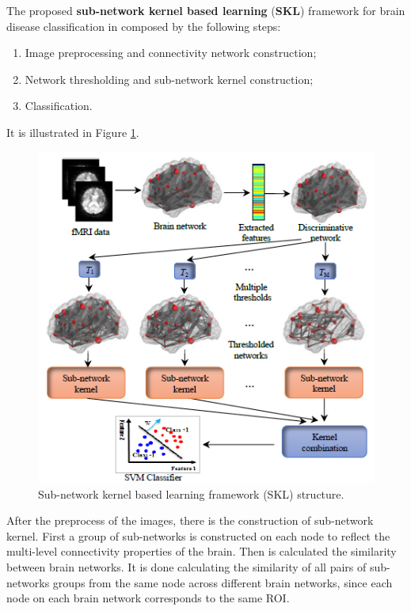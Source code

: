 The proposed \textbf{sub-network kernel based learning} (\textbf{SKL}) framework for brain disease classification in composed by the following steps: 

\begin{enumerate}
	\item Image preprocessing and connectivity network construction;
	\item Network thresholding and sub-network kernel construction;
	\item Classification.
\end{enumerate}

It is illustrated in Figure \ref{fig:diagram15}.

\begin{figure}[htbp]
	\centering
	\includegraphics[scale=0.8]{Immagini/subnetwork1.PNG}
	\caption{Sub-network kernel based learning framework (SKL) structure.}
	\label{fig:diagram15}
\end{figure}

After the preprocess of the images, there is the construction of sub-network kernel. First a group of sub-networks is constructed on each node to reflect the multi-level connectivity properties of the brain. Then is calculated the similarity between brain networks. It is done calculating the similarity of all pairs of sub-networks groups from the same node across different brain networks, since each node on each brain network corresponds to the same ROI. 
\\

